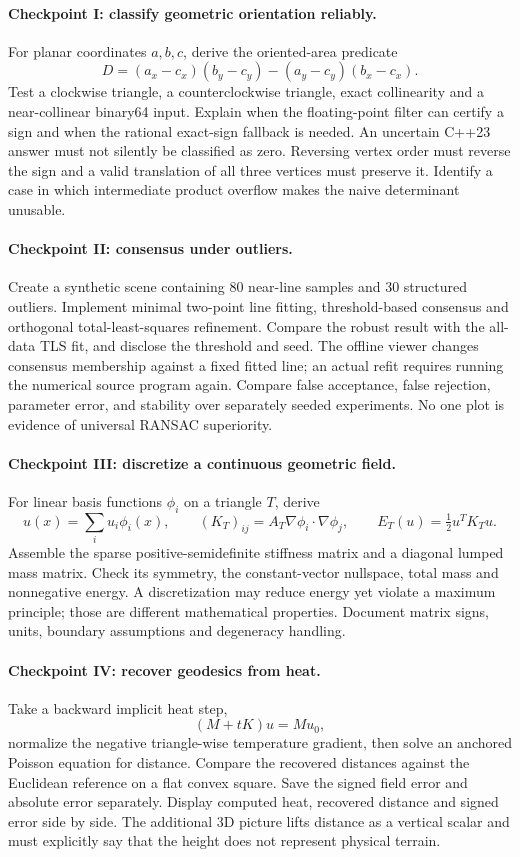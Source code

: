 \paragraph{Checkpoint I: classify geometric orientation reliably.}
For planar coordinates \(a,b,c\), derive the oriented-area predicate
\[
D=(a_x-c_x)(b_y-c_y)-(a_y-c_y)(b_x-c_x).
\]
Test a clockwise triangle, a counterclockwise triangle, exact collinearity
and a near-collinear binary64 input. Explain when the floating-point filter
can certify a sign and when the rational exact-sign fallback is needed.
An uncertain C++23 answer must not silently be classified as zero.
Reversing vertex order must reverse the sign and a valid translation of
all three vertices must preserve it. Identify a case in which intermediate
product overflow makes the naive determinant unusable.

\paragraph{Checkpoint II: consensus under outliers.}
Create a synthetic scene containing 80 near-line samples and 30 structured
outliers. Implement minimal two-point line fitting, threshold-based
consensus and orthogonal total-least-squares refinement. Compare the
robust result with the all-data TLS fit, and disclose the threshold and seed.
The offline viewer changes consensus membership against a fixed fitted
line; an actual refit requires running the numerical source program again.
Compare false acceptance, false rejection, parameter error, and stability
over separately seeded experiments. No one plot is evidence of universal
RANSAC superiority.

\paragraph{Checkpoint III: discretize a continuous geometric field.}
For linear basis functions \(\phi_i\) on a triangle \(T\), derive
\[
u(x)=\sum_i u_i\phi_i(x),\qquad
(K_T)_{ij}=A_T\nabla\phi_i\cdot\nabla\phi_j,\qquad
E_T(u)=\tfrac12u^TK_Tu.
\]
Assemble the sparse positive-semidefinite stiffness matrix and a diagonal
lumped mass matrix. Check its symmetry, the constant-vector nullspace,
total mass and nonnegative energy. A discretization may reduce energy yet
violate a maximum principle; those are different mathematical properties.
Document matrix signs, units, boundary assumptions and degeneracy handling.

\paragraph{Checkpoint IV: recover geodesics from heat.}
Take a backward implicit heat step,
\[
(M+tK)u=Mu_0,
\]
normalize the negative triangle-wise temperature gradient, then solve
an anchored Poisson equation for distance. Compare the recovered distances
against the Euclidean reference on a flat convex square. Save the signed
field error and absolute error separately. Display computed heat, recovered
distance and signed error side by side. The additional 3D picture lifts
distance as a vertical scalar and must explicitly say that the height
does not represent physical terrain.

